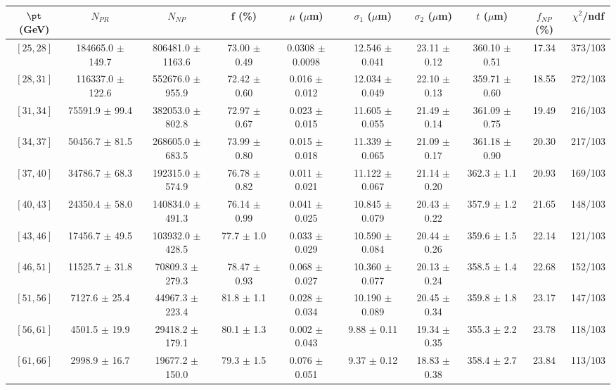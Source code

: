\begin{tabular}{c||c|c|c|c|c|c|c||c|c}
$\pt$ (GeV) & $N_{PR}$ & $N_{NP}$ & f (\%) & $\mu$ ($\mu$m) & $\sigma_1$ ($\mu$m) & $\sigma_2$ ($\mu$m)  & $t$ ($\mu$m) & $f_{NP}$ (\%) & $\chi^2$/ndf \\
\hline
$[25, 28]$ & 184665.0 $\pm$ 149.7 & 806481.0 $\pm$ 1163.6 & 73.00 $\pm$ 0.49 & 0.0308 $\pm$ 0.0098 & 12.546 $\pm$ 0.041 & 23.11 $\pm$ 0.12 & 360.10 $\pm$ 0.51 & 17.34 & 373/103\\
$[28, 31]$ & 116337.0 $\pm$ 122.6 & 552676.0 $\pm$ 955.9 & 72.42 $\pm$ 0.60 & 0.016 $\pm$ 0.012 & 12.034 $\pm$ 0.049 & 22.10 $\pm$ 0.13 & 359.71 $\pm$ 0.60 & 18.55 & 272/103\\
$[31, 34]$ & 75591.9 $\pm$ 99.4 & 382053.0 $\pm$ 802.8 & 72.97 $\pm$ 0.67 & 0.023 $\pm$ 0.015 & 11.605 $\pm$ 0.055 & 21.49 $\pm$ 0.14 & 361.09 $\pm$ 0.75 & 19.49 & 216/103\\
$[34, 37]$ & 50456.7 $\pm$ 81.5 & 268605.0 $\pm$ 683.5 & 73.99 $\pm$ 0.80 & 0.015 $\pm$ 0.018 & 11.339 $\pm$ 0.065 & 21.09 $\pm$ 0.17 & 361.18 $\pm$ 0.90 & 20.30 & 217/103\\
$[37, 40]$ & 34786.7 $\pm$ 68.3 & 192315.0 $\pm$ 574.9 & 76.78 $\pm$ 0.82 & 0.011 $\pm$ 0.021 & 11.122 $\pm$ 0.067 & 21.14 $\pm$ 0.20 & 362.3 $\pm$ 1.1 & 20.93 & 169/103\\
$[40, 43]$ & 24350.4 $\pm$ 58.0 & 140834.0 $\pm$ 491.3 & 76.14 $\pm$ 0.99 & 0.041 $\pm$ 0.025 & 10.845 $\pm$ 0.079 & 20.43 $\pm$ 0.22 & 357.9 $\pm$ 1.2 & 21.65 & 148/103\\
$[43, 46]$ & 17456.7 $\pm$ 49.5 & 103932.0 $\pm$ 428.5 & 77.7 $\pm$ 1.0 & 0.033 $\pm$ 0.029 & 10.590 $\pm$ 0.084 & 20.44 $\pm$ 0.26 & 359.6 $\pm$ 1.5 & 22.14 & 121/103\\
$[46, 51]$ & 11525.7 $\pm$ 31.8 & 70809.3 $\pm$ 279.3 & 78.47 $\pm$ 0.93 & 0.068 $\pm$ 0.027 & 10.360 $\pm$ 0.077 & 20.13 $\pm$ 0.24 & 358.5 $\pm$ 1.4 & 22.68 & 152/103\\
$[51, 56]$ & 7127.6 $\pm$ 25.4 & 44967.3 $\pm$ 223.4 & 81.8 $\pm$ 1.1 & 0.028 $\pm$ 0.034 & 10.190 $\pm$ 0.089 & 20.45 $\pm$ 0.34 & 359.8 $\pm$ 1.8 & 23.17 & 147/103\\
$[56, 61]$ & 4501.5 $\pm$ 19.9 & 29418.2 $\pm$ 179.1 & 80.1 $\pm$ 1.3 & 0.002 $\pm$ 0.043 & 9.88 $\pm$ 0.11 & 19.34 $\pm$ 0.35 & 355.3 $\pm$ 2.2 & 23.78 & 118/103\\
$[61, 66]$ & 2998.9 $\pm$ 16.7 & 19677.2 $\pm$ 150.0 & 79.3 $\pm$ 1.5 & 0.076 $\pm$ 0.051 & 9.37 $\pm$ 0.12 & 18.83 $\pm$ 0.38 & 358.4 $\pm$ 2.7 & 23.84 & 113/103\\

\end{tabular}
